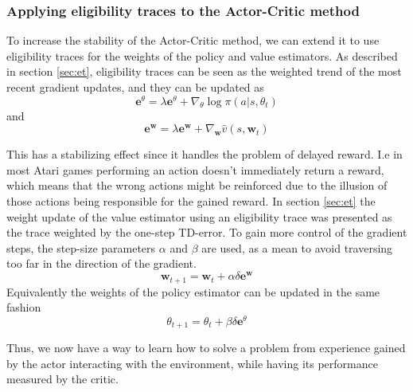\documentclass[11pt]{article}
\begin{document}

\newpage
\subsubsection{Applying eligibility traces to the Actor-Critic method}\label{sec:actor_critic_el}

To increase the stability of the Actor-Critic method, we can extend it to use eligibility traces
for the weights of the policy and value estimators.
As described in section \ref{sec:et}, eligibility traces can be seen as the weighted trend
of the most recent gradient updates, and they can be updated as
\begin{equation}
    \mathbf{e}^{\theta} = \lambda \mathbf{e}^{\theta} + \nabla_\theta \log\pi(a|s,\theta_t)
\end{equation}
and
\begin{equation}
    \mathbf{e}^{\mathbf{w}} = \lambda \mathbf{e}^{\mathbf{w}} + \nabla_\mathbf{w} \hat{v}(s, \mathbf{w}_t)
\end{equation}

This has a stabilizing effect since it handles the problem of delayed reward.
I.e in most Atari games performing an action doesn't immediately return a reward,
which means that the wrong actions might be reinforced due to the illusion
of those actions being responsible for the gained reward.
In section \ref{sec:et} the weight update of the value estimator
using an eligibility trace was presented as the trace weighted by
the one-step TD-error.
To gain more control of the gradient steps, the step-size parameters $\alpha$ and $\beta$ are used,
as a mean to avoid traversing too far in the direction of the gradient.
\begin{equation*}
    \mathbf{w}_{t+1}= \mathbf{w}_t + \alpha \delta \mathbf{e}^{\mathbf{w}}
\end{equation*}
Equivalently the weights of the policy estimator can be updated in the same fashion
\begin{equation}
    \theta_{t+1} = \theta_t + \beta \delta \mathbf{e}^\theta
\end{equation}

Thus, we now have a way to learn how to solve a problem from experience gained
by the actor interacting with the environment, while having its performance
measured by the critic.

%
%
\end{document}
